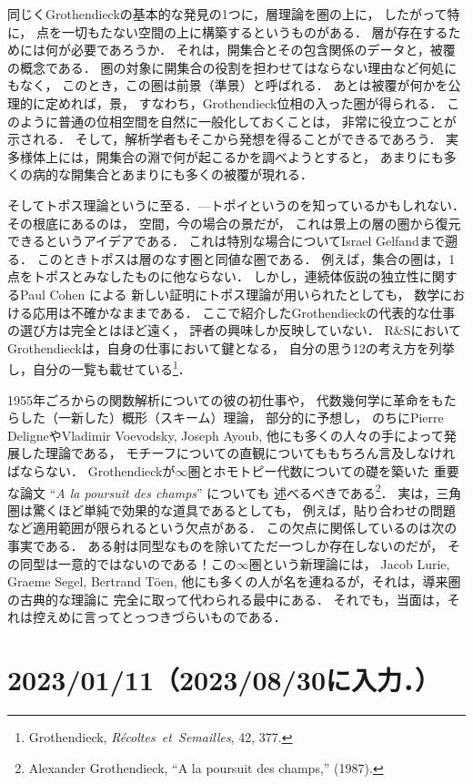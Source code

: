 \documentclass[11pt, a4paper, dvipdfmx]{jlreq}
\theoremstyle{definition}
\theoremstyle{mystyle}
\numberwithin{equation}{section} %
\begin{document}
同じくGrothendieckの基本的な発見の1つに，層理論を圏の上に，
したがって特に，
点を一切もたない空間の上に構築するというものがある．
層が存在するためには何が必要であろうか．
それは，開集合とその包含関係のデータと，被覆の概念である．
圏の対象に開集合の役割を担わせてはならない理由など何処にもなく，
このとき，この圏は前景（準景）と呼ばれる．
あとは被覆が何かを公理的に定めれば，景，
すなわち，Grothendieck位相の入った圏が得られる．
このように普通の位相空間を自然に一般化しておくことは，
非常に役立つことが示される．
そして，解析学者もそこから発想を得ることができるであろう．
実多様体上には，開集合の淵で何が起こるかを調べようとすると，
あまりにも多くの病的な開集合とあまりにも多くの被覆が現れる．

そしてトポス理論というに至る．---トポイというのを知っているかもしれない．
その根底にあるのは，
空間，今の場合の景だが，
これは景上の層の圏から復元できるというアイデアである．
これは特別な場合についてIsrael Gelfandまで遡る．
このときトポスは層のなす圏と同値な圏である．
例えば，集合の圏は，1点をトポスとみなしたものに他ならない．
しかし，連続体仮説の独立性に関するPaul Cohen による
新しい証明にトポス理論が用いられたとしても，
数学における応用は不確かなままである．
ここで紹介したGrothendieckの代表的な仕事の選び方は完全とはほど遠く，
評者の興味しか反映していない．
R\&SにおいてGrothendieckは，自身の仕事において鍵となる，
自分の思う12の考え方を列挙し，自分の一覧も載せている\footnote[12]{
    Grothendieck,
    \textit{R\'ecoltes\ et\ Semailles}, 42, 377.
}．

1955年ごろからの関数解析についての彼の初仕事や，
代数幾何学に革命をもたらした（一新した）概形（スキーム）理論，
部分的に予想し，
のちにPierre DeligneやVladimir Voevodsky, Joseph Ayoub, 
他にも多くの人々の手によって発展した理論である，
モチーフについての直観についてももちろん言及しなければならない．
Grothendieckが$\infty$圏とホモトピー代数についての礎を築いた
重要な論文 ``\textit{A la poursuit des champs}'' についても
述べるべきである\footnote[13]{
    Alexander Grothendieck, ``A la poursuit des champs,'' (1987).
}．
実は，三角圏は驚くほど単純で効果的な道具であるとしても，
例えば，貼り合わせの問題など適用範囲が限られるという欠点がある．
この欠点に関係しているのは次の事実である．
ある射は同型なものを除いてただ一つしか存在しないのだが，
その同型は一意的ではないのである！この$\infty$圏という新理論には，
Jacob Lurie, Graeme Segel, Bertrand T\"oen, 
他にも多くの人が名を連ねるが，それは，導来圏の古典的な理論に
完全に取って代わられる最中にある．
それでも，当面は，それは控えめに言ってとっつきづらいものである．


\section*{2023/01/11（2023/08/30に入力．）}
\end{document}

